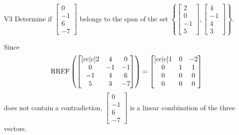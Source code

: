 \begin{problem}{V3}
  Determine if
  \(\begin{bmatrix} 0 \\ -1 \\ 6 \\ -7 \end{bmatrix}\)
  belongs to the span of the set
  \(\left\{
    \begin{bmatrix} 2 \\ 0 \\ -1 \\ 5 \end{bmatrix},
    \begin{bmatrix} 4 \\ -1 \\ 4 \\ 3 \end{bmatrix}
    \right\}
  \).
\end{problem}
\begin{solution}
  Since
  \[
    \operatorname{RREF}\left(
      \begin{bmatrix}[cc|c]
        2 & 4 & 0 \\
        0 & -1 & -1 \\
        -1 & 4 & 6 \\
        5 & 3 & -7
      \end{bmatrix}
    \right) =
    \begin{bmatrix}[cc|c]
      1 & 0 & -2 \\
      0 & 1 & 1 \\
      0 & 0 & 0 \\
      0 & 0 & 0
    \end{bmatrix}
  \]
  does not contain a contradiction,
  \(\begin{bmatrix} 0 \\ -1 \\ 6 \\ -7 \end{bmatrix}\) is
  a linear combination of the three vectors.
\end{solution}


